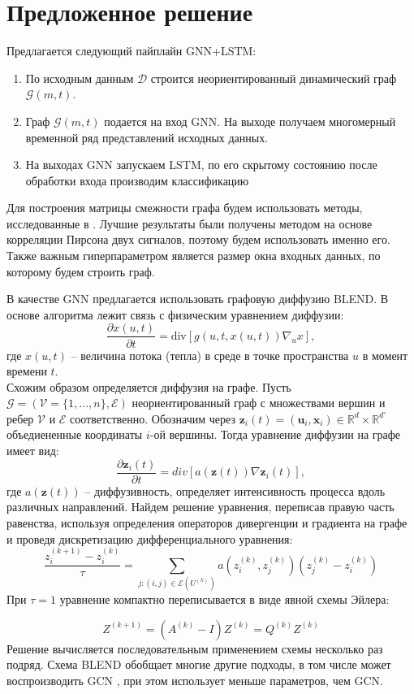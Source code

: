 \documentclass{article}
\begin{document}
\section{Предложенное решение}
Предлагается следующий пайплайн GNN+LSTM:
\begin{enumerate}
    \item По исходным данным $\mathcal{D}$ строится неориентированный динамический граф $\mathcal{G}(m, t)$.
    \item Граф $\mathcal{G}(m, t)$ подается на вход GNN. На выходе получаем многомерный временной ряд представлений исходных данных.
    \item На выходах GNN запускаем LSTM, по его скрытому состоянию после обработки входа производим классификацию
\end{enumerate}
Для построения матрицы смежности графа будем использовать методы, исследованные в \cite{varenik2022}. Лучшие результаты были получены методом на основе корреляции Пирсона двух сигналов, поэтому будем использовать именно его. Также важным гиперпараметром является размер окна входных данных, по которому будем строить граф.
\par
В качестве GNN предлагается использовать графовую диффузию BLEND. В основе алгоритма лежит связь с физическим уравнением диффузии:
$$
\frac{\partial x(u,t)}{\partial t} = \text{div}[g(u, t, x(u,t))\nabla_u x],
$$
где $x(u,t)$ -- величина потока (тепла) в среде в точке пространства $u$ в момент времени $t$. \\Схожим образом определяется диффузия на графе. Пусть $\mathcal{G} = (\mathcal{V}=\{1,...,n\},\mathcal{E})$ неориентированный граф с множествами вершин и ребер $\mathcal{V}$ и $\mathcal{E}$ соответственно. Обозначим через $\mathbf{z}_i(t) = (\mathbf{u}_i, \mathbf{x}_i)\in\mathbb{R}^d\times\mathbb{R}^{d'}$ объедиененные координаты $i$-ой вершины. Тогда уравнение диффузии на графе имеет вид:
$$ \frac{\partial{\mathbf{z}_i(t)}}{\partial{t}} = div [a(\mathbf{z}(t))\nabla \mathbf{z}_i(t)],
$$
где $a(\mathbf{z}(t))$ -- диффузивность, определяет интенсивность процесса вдоль различных направлений. Найдем решение уравнения, переписав правую часть равенства, используя определения операторов дивергенции и градиента на графе и проведя дискретизацию дифференциального уравнения:
$$
    \frac{z^{(k+1)}_i - z^{(k)}_i}{\tau} = \sum\limits_{j:(i,j)\in\mathcal{E}(U^{(k)})}a(z^{(k)}_i, z^{(k)}_j)(z^{(k)}_j - z^{(k)}_i) 
$$
При $\tau = 1$ уравнение компактно переписывается в виде явной схемы Эйлера:

$$ Z^{(k+1)} = (A^{(k)} - I)Z^{(k)} = Q^{(k)}Z^{(k)}$$
Решение вычисляется последовательным применением схемы несколько раз подряд. Схема BLEND обобщает многие другие подходы, в том числе может воспроизводить GCN \cite{chamberlain2021blend}, при этом использует меньше параметров, чем GCN.
\end{document}
